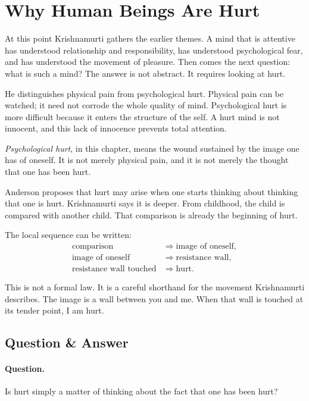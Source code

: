 \section{Why Human Beings Are Hurt}

At this point Krishnamurti gathers the earlier themes. A mind that is attentive has understood relationship and responsibility, has understood psychological fear, and has understood the movement of pleasure. Then comes the next question: what is such a mind? The answer is not abstract. It requires looking at hurt.

He distinguishes physical pain from psychological hurt. Physical pain can be watched; it need not corrode the whole quality of mind. Psychological hurt is more difficult because it enters the structure of the self. A hurt mind is not innocent, and this lack of innocence prevents total attention.

\begin{definition}
\emph{Psychological hurt}, in this chapter, means the wound sustained by the image one has of oneself. It is not merely physical pain, and it is not merely the thought that one has been hurt.
\end{definition}

Anderson proposes that hurt may arise when one starts thinking about thinking that one is hurt. Krishnamurti says it is deeper. From childhood, the child is compared with another child. That comparison is already the beginning of hurt.

The local sequence can be written:
\begin{align}
\text{comparison}
&\Rightarrow \text{image of oneself},\\
\text{image of oneself}
&\Rightarrow \text{resistance wall},\\
\text{resistance wall touched}
&\Rightarrow \text{hurt}.
\end{align}

This is not a formal law. It is a careful shorthand for the movement Krishnamurti describes. The image is a wall between you and me. When that wall is touched at its tender point, I am hurt.

\subsection{Question \& Answer}

\paragraph{Question.}
Is hurt simply a matter of thinking about the fact that one has been hurt?

